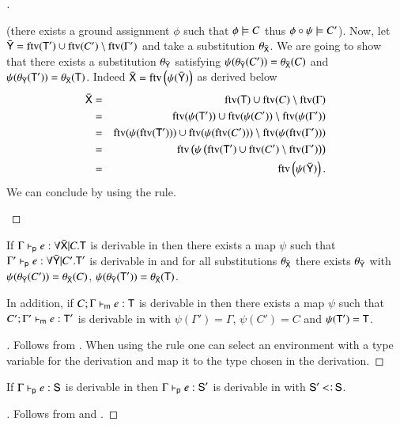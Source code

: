 \documentclass{report}
\begin{document}
\begin{proof}[]
\begin{indcase}{\sdfin}
      (there exists a ground assignment $\phi$ such that $\phi\models C$ thus $\phi\circ\psi\models C'$).
      Now, let $\bar{\textsf{Y}}=\mathop{\rm ftv}\nolimits(\textsf{T}')\cup\mathop{\rm ftv}\nolimits(C')\setminus\mathop{\rm ftv}\nolimits(\Gamma')$ and take a substitution
      $\theta_{\bar{\textsf{X}}}$. We are going to show that there exists a substitution $\theta_{\bar{\textsf{Y}}}$
      satisfying $\psi(\theta_{\bar{\textsf{Y}}}(C'))=\theta_{\bar{\textsf{X}}}(C)$ and
      $\psi(\theta_{\bar{\textsf{Y}}}(\textsf{T}'))=\theta_{\bar{\textsf{X}}}(\textsf{T})$.
      Indeed $\bar{\textsf{X}}=\mathop{\rm ftv}\nolimits\left({\psi(\bar{\textsf{Y}})}\right)$ as derived below
      \begin{eqnarray*}
        \bar{\textsf{X}} &=& \mathop{\rm ftv}\nolimits(\textsf{T})\cup\mathop{\rm ftv}\nolimits(C)\setminus\mathop{\rm ftv}\nolimits(\Gamma) \\
          &=& \mathop{\rm ftv}\nolimits(\psi(\textsf{T}'))\cup\mathop{\rm ftv}\nolimits(\psi(C'))\setminus\mathop{\rm ftv}\nolimits(\psi(\Gamma')) \\
          &=& \mathop{\rm ftv}\nolimits(\psi(\mathop{\rm ftv}\nolimits(\textsf{T}')))\cup\mathop{\rm ftv}\nolimits(\psi(\mathop{\rm ftv}\nolimits(C')))\setminus\mathop{\rm ftv}\nolimits(\psi(\mathop{\rm ftv}\nolimits(\Gamma'))) \\
          &=& \mathop{\rm ftv}\nolimits\left({\psi\left({\mathop{\rm ftv}\nolimits(\textsf{T}')\cup\mathop{\rm ftv}\nolimits(C')\setminus\mathop{\rm ftv}\nolimits(\Gamma')}\right)}\right) \\
          &=& \mathop{\rm ftv}\nolimits\left({\psi(\bar{\textsf{Y}})}\right)\textrm{.}
      \end{eqnarray*}
      We can conclude by using the \sdfin rule.
    \end{indcase}
  \end{proof}
  \begin{cor}
    If $\Gamma\vdash_\textsf{p} e:\forall\bar{\textsf{X}}|C.\textsf{T}$ is derivable in \BQa then
    there exists a map $\psi$ such that
    $\Gamma'\vdash_\textsf{p} e:\forall\bar{\textsf{Y}}|C'.\textsf{T}'$ is derivable in \BQ
    and for all substitutions $\theta_{\bar{\textsf{X}}}$ there exists $\theta_{\bar{\textsf{Y}}}$
    with $\psi({\theta_{\bar{\textsf{Y}}}(C')})=\theta_{\bar{\textsf{X}}}(C)$,
    $\psi({\theta_{\bar{\textsf{Y}}}(\textsf{T}')})=\theta_{\bar{\textsf{X}}}(\textsf{T})$.
    
    In addition, if $C;\Gamma\vdash_\textsf{m} e:\textsf{T}$ is
    derivable in \BQa then
    there exists a map $\psi$ such that
    $C';\Gamma'\vdash_\textsf{m} e:\textsf{T}'$
    is derivable in \BQ with $\psi(\Gamma')=\Gamma$, $\psi(C')=C$ and $\psi(\textsf{T}')=\textsf{T}$.
  \end{cor}
  \begin{proof}[]
    Follows from . When using the \sdabs rule one can select an environment
    with a type variable for the \BQ derivation and map it to the type chosen in the \BQa derivation.
  \end{proof}
  \begin{cor}
    If $\Gamma\vdash_\textsf{p} e:\textsf{S}$ is derivable in \BQsa then
    $\Gamma\vdash_\textsf{p} e:\textsf{S}'$ is derivable in \BQ with $\type{S}'\subtype\type{S}$.
  \end{cor}
  \begin{proof}[]
    Follows from  and .
  \end{proof}
  
\end{document}
